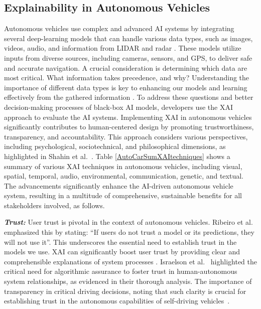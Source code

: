 \documentclass[final,5p,times,twocolumn]{elsarticle}
\begin{document}
\subsection{Explainability in Autonomous Vehicles}
Autonomous vehicles use complex and advanced AI systems by integrating several deep-learning models that can handle various data types, such as images, videos, audio, and information from LIDAR and radar \cite{al2022generating}. These models utilize inputs from diverse sources, including cameras, sensors, and GPS, to deliver safe and accurate navigation. A crucial consideration is determining which data are most critical. What information takes precedence, and why? Understanding the importance of different data types is key to enhancing our models and learning effectively from the gathered information \cite{alshami2023pose2trajectory}. To address these questions and better decision-making processes of black-box AI models, developers use the XAI approach to evaluate the AI systems. Implementing XAI in autonomous vehicles significantly contributes to human-centered design by promoting trustworthiness, transparency, and accountability. This approach considers various perspectives, including psychological, sociotechnical, and philosophical dimensions, as highlighted in Shahin et al.~\cite{atakishiyev2021explainable}. Table \ref{AutoCarSumXAItechniques} shows a summary of various XAI techniques in autonomous vehicles, including visual, spatial, temporal, audio, environmental, communication, genetic, and textual. The advancements significantly enhance the AI-driven autonomous vehicle system, resulting in a multitude of comprehensive, sustainable benefits for all stakeholders involved, as follows.

\textbf{ \textit{Trust:}} User trust is pivotal in the context of autonomous vehicles. Ribeiro et al.~\cite{ribeiro2016should} emphasized this by stating: ``If users do not trust a model or its predictions, they will not use it''. This underscores the essential need to establish trust in the models we use. %
XAI can significantly boost user trust by providing clear and comprehensible explanations of system processes \cite{holliday2016user}. Israelson et al.~\cite{israelsen2019dave} highlighted the critical need for algorithmic assurance to foster trust in human-autonomous system relationships, as evidenced in their thorough analysis. The importance of transparency in critical driving decisions, noting that such clarity is crucial for establishing trust in the autonomous capabilities of self-driving vehicles~\cite{atakishiyev2021towards}. 
\end{document}
